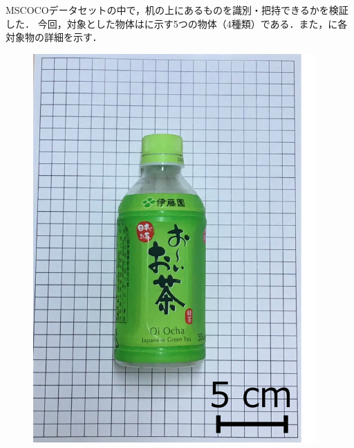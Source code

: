 MSCOCOデータセットの中で，机の上にあるものを識別・把持できるかを検証した．
今回，対象とした物体はに示す5つの物体（4種類）である．また，に各対象物の詳細を示す．
\begin{figure}[H]
    \centering
    
    \begin{minipage}{0.19\columnwidth}
        \centering
        \includegraphics[clip, width=\linewidth]{figure/chapter4/bottle_350ml}
    \end{minipage}
    \begin{minipage}{0.19\columnwidth}
        \centering

\end{minipage}
\end{figure}
